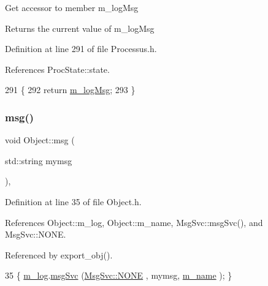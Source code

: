 Get accessor to member m\+\_\+log\+Msg \begin{DoxyReturn}{Returns}
the current value of m\+\_\+log\+Msg 
\end{DoxyReturn}


Definition at line 291 of file Processus.\+h.



References Proc\+State\+::state.


\begin{DoxyCode}
291                       \{
292     \textcolor{keywordflow}{return} \hyperlink{classProcessus_a3bc0140a3a69a83951ab7f9986bd2c84}{m\_logMsg};
293   \}
\end{DoxyCode}
\mbox{\label{classObject_a58b2d0618c2d08cf2383012611528d97}} 
\subsubsection{\texorpdfstring{msg()}{msg()}\hspace{0.1cm}{\footnotesize\ttfamily [1/2]}}
{\footnotesize\ttfamily void Object\+::msg (\begin{DoxyParamCaption}\item[{std\+::string}]{mymsg }\end{DoxyParamCaption})\hspace{0.3cm}{\ttfamily [inline]}, {\ttfamily [inherited]}}



Definition at line 35 of file Object.\+h.



References Object\+::m\+\_\+log, Object\+::m\+\_\+name, Msg\+Svc\+::msg\+Svc(), and Msg\+Svc\+::\+N\+O\+NE.



Referenced by export\+\_\+obj().


\begin{DoxyCode}
35 \{ \hyperlink{classObject_a0d269813dd7ac1f24bc143031e2963f2}{m\_log}.\hyperlink{classMsgSvc_ad25f18047920cc59a314e5098259711c}{msgSvc} (\hyperlink{classMsgSvc_ae671eb7301996cd049d2da8a65925926a9be9ae32fed8e1e6eba4a58692210fbd}{MsgSvc::NONE}    , mymsg, \hyperlink{classObject_a8b83c95c705d2c3ba0d081fe1710f48d}{m\_name} ); \}
\end{DoxyCode}
\mbox{\label{classObject_ac5d59299273cee27aacf7de00d2e7034}} 
